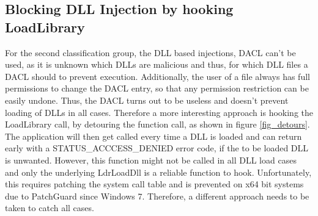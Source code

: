 \subsection{Blocking DLL Injection by hooking LoadLibrary}
For the second classification group, the DLL based injections, DACL can't be used, as it is unknown which DLLs are malicious and thus, for which DLL files a DACL should to prevent execution. Additionally, the user of a file always has full permissions to change the DACL entry, so that any permission restriction can be easily undone. Thus, the DACL turns out to be useless and doesn't prevent loading of DLLs in all cases. Therefore a more interesting approach is hooking the LoadLibrary call, by detouring the function call, as shown in figure \ref{fig_detours}. The application will then get called every time a DLL is loaded and can return early with a STATUS\_ACCCESS\_DENIED error code, if the to be loaded DLL is unwanted. However, this function might not be called in all DLL load cases and only the underlying LdrLoadDll is a reliable function to hook. Unfortunately, this requires patching the system call table and is prevented on x64 bit systems due to PatchGuard since Windows 7. Therefore, a different approach needs to be taken to catch all cases.

